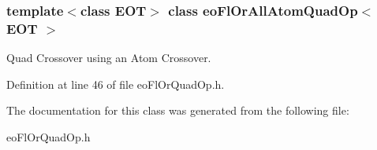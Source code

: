 \subsubsection*{template$<$class EOT$>$ class eo\-Fl\-Or\-All\-Atom\-Quad\-Op$<$ EOT $>$}

Quad Crossover using an Atom Crossover. 



Definition at line 46 of file eo\-Fl\-Or\-Quad\-Op.h.

The documentation for this class was generated from the following file:\begin{CompactItemize}
\item 
eo\-Fl\-Or\-Quad\-Op.h\end{CompactItemize}
